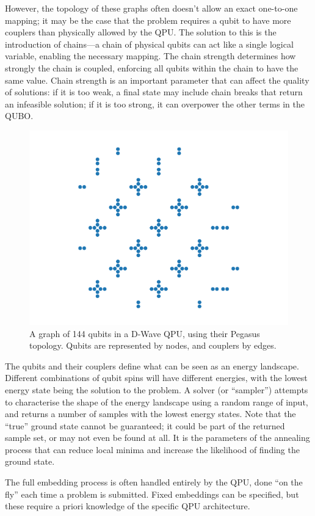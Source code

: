 \documentclass[12pt]{article}
\begin{document}
However, the topology of these graphs often doesn't allow an exact one-to-one mapping; it may be the case that the problem requires a qubit to have more couplers than physically allowed by the QPU. The solution to this is the introduction of chains—a chain of physical qubits can act like a single logical variable, enabling the necessary mapping. The chain strength determines how strongly the chain is coupled, enforcing all qubits within the chain to have the same value. Chain strength is an important parameter that can affect the quality of solutions: if it is too weak, a final state may include chain breaks that return an infeasible solution; if it is too strong, it can overpower the other terms in the QUBO.

\begin{figure}[b]
    \centering
    \includegraphics[width=0.5\linewidth]{../Figures/pegasus.pdf}
    \caption{A graph of 144 qubits in a D-Wave QPU, using their Pegasus topology. Qubits are represented by nodes, and couplers by edges.}
    \label{fig:pegasus}
\end{figure}

The qubits and their couplers define what can be seen as an energy landscape. Different combinations of qubit spins will have different energies, with the lowest energy state being the solution to the problem. A solver (or ``sampler'') attempts to characterise the shape of the energy landscape using a random range of input, and returns a number of samples with the lowest energy states. Note that the ``true'' ground state cannot be guaranteed; it could be part of the returned sample set, or may not even be found at all. It is the parameters of the annealing process that can reduce local minima and increase the likelihood of finding the ground state.

The full embedding process is often handled entirely by the QPU, done ``on the fly'' each time a problem is submitted. Fixed embeddings can be specified, but these require a priori knowledge of the specific QPU architecture.
\end{document}
